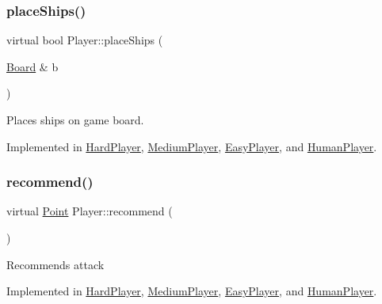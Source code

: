 \mbox{\label{class_player_ab89c1180c7314d3e19bcf4b2bed2e02a}} 
\subsubsection{\texorpdfstring{place\+Ships()}{placeShips()}}
{\footnotesize\ttfamily virtual bool Player\+::place\+Ships (\begin{DoxyParamCaption}\item[{\mbox{\hyperlink{class_board}{Board}} \&}]{b }\end{DoxyParamCaption})\hspace{0.3cm}{\ttfamily [pure virtual]}}



Places ships on game board. 



Implemented in \mbox{\hyperlink{class_hard_player_a27d0ad3353eba585d7a93d2092036f98}{Hard\+Player}}, \mbox{\hyperlink{class_medium_player_ac4d4748e2c27a2a51033bbce9f12de26}{Medium\+Player}}, \mbox{\hyperlink{class_easy_player_a4b9d5815113f393615412f7a98176a6c}{Easy\+Player}}, and \mbox{\hyperlink{class_human_player_ae9315a3c66f6b2f2bf4d1ebb09669aff}{Human\+Player}}.

\mbox{\label{class_player_a2cc7a83d11158eafd8d49d4b9f23ce56}} 
\subsubsection{\texorpdfstring{recommend()}{recommend()}}
{\footnotesize\ttfamily virtual \mbox{\hyperlink{class_point}{Point}} Player\+::recommend (\begin{DoxyParamCaption}{ }\end{DoxyParamCaption})\hspace{0.3cm}{\ttfamily [pure virtual]}}

Recommends attack 

Implemented in \mbox{\hyperlink{class_hard_player_ae1d21325a648a88f1bf51f2b0b286190}{Hard\+Player}}, \mbox{\hyperlink{class_medium_player_a2e99d57f30f3f7f929840b8cda16527d}{Medium\+Player}}, \mbox{\hyperlink{class_easy_player_a9b00f4a9acc74ff688c609bc15bdbb4d}{Easy\+Player}}, and \mbox{\hyperlink{class_human_player_a718f16f3ddeeb34c9f2e93cf1d805b46}{Human\+Player}}.

